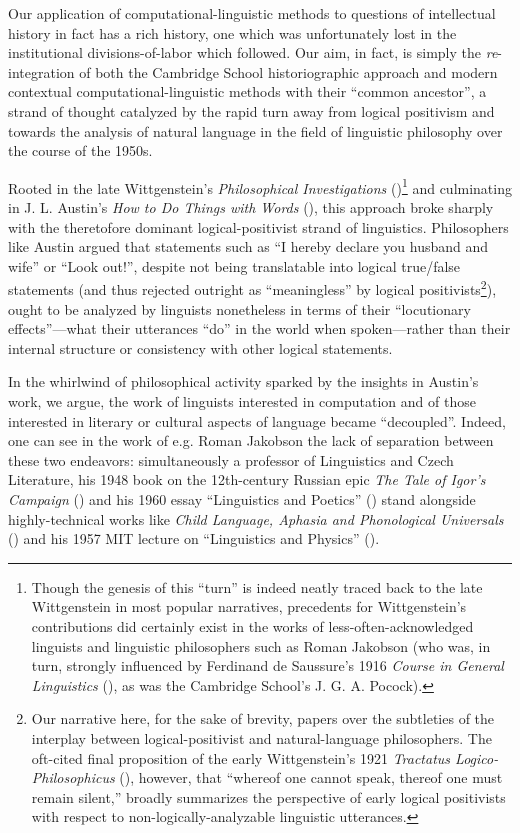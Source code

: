 \documentclass[11pt]{article}
\begin{document}
Our application of computational-linguistic methods to questions of intellectual history in fact has a rich history, one which was unfortunately lost in the institutional divisions-of-labor which followed. Our aim, in fact, is simply the \textit{re}-integration of both the Cambridge School historiographic approach and modern contextual computational-linguistic methods with their ``common ancestor'', a strand of thought catalyzed by the rapid turn away from logical positivism and towards the analysis of natural language in the field of linguistic philosophy over the course of the 1950s.
	
Rooted in the late Wittgenstein's \textit{Philosophical Investigations} (\cite{wittgenstein_philosophical_1953})\footnote{Though the genesis of this ``turn'' is indeed neatly traced back to the late Wittgenstein in most popular narratives, precedents for Wittgenstein's contributions did certainly exist in the works of less-often-acknowledged linguists and linguistic philosophers such as Roman Jakobson (who was, in turn, strongly influenced by Ferdinand de Saussure's 1916 \textit{Course in General Linguistics} (\cite{saussure_course_1916}), as was the Cambridge School's J. G. A. Pocock).} and culminating in J. L. Austin's \textit{How to Do Things with Words} (\cite{austin_how_1962}), this approach broke sharply with the theretofore dominant logical-positivist strand of linguistics. Philosophers like Austin argued that statements such as ``I hereby declare you husband and wife'' or ``Look out!'', despite not being translatable into logical true/false statements (and thus rejected outright as ``meaningless'' by logical positivists\footnote{Our narrative here, for the sake of brevity, papers over the subtleties of the interplay between logical-positivist and natural-language philosophers. The oft-cited final proposition of the early Wittgenstein's 1921 \textit{Tractatus Logico-Philosophicus} (\cite{wittgenstein_tractatus_1921}), however, that ``whereof one cannot speak, thereof one must remain silent,'' broadly summarizes the perspective of early logical positivists with respect to non-logically-analyzable linguistic utterances.}), ought to be analyzed by linguists nonetheless in terms of their ``locutionary effects''---what their utterances ``do'' in the world when spoken---rather than their internal structure or consistency with other logical statements.
	
In the whirlwind of philosophical activity sparked by the insights in Austin's work, we argue, the work of linguists interested in computation and of those interested in literary or cultural aspects of language became ``decoupled''. Indeed, one can see in the work of e.g. Roman Jakobson the lack of separation between these two endeavors: simultaneously a professor of Linguistics and Czech Literature, his 1948 book on the 12th-century Russian epic \textit{The Tale of Igor's Campaign} (\cite{gregoire_geste_1948}) and his 1960 essay ``Linguistics and Poetics'' (\cite{jakobson_linguistics_1960}) stand alongside highly-technical works like \textit{Child Language, Aphasia and Phonological Universals} (\cite{jakobson_child_1941}) and his 1957 MIT lecture on ``Linguistics and Physics'' (\cite{jakobson_linguistics_1957}).
	
\end{document}
